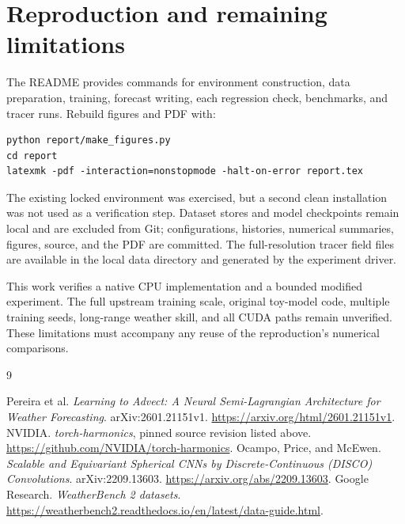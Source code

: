 \documentclass[10pt]{article}
\begin{document}
\section{Reproduction and remaining limitations}
The README provides commands for environment construction, data preparation,
training, forecast writing, each regression check, benchmarks, and tracer runs.
Rebuild figures and PDF with:
\begin{verbatim}
python report/make_figures.py
cd report
latexmk -pdf -interaction=nonstopmode -halt-on-error report.tex
\end{verbatim}
The existing locked environment was exercised, but a second clean installation
was not used as a verification step. Dataset stores and model checkpoints remain
local and are excluded from Git; configurations, histories, numerical summaries,
figures, source, and the PDF are committed. The full-resolution tracer field files
are available in the local data directory and generated by the experiment driver.

This work verifies a native CPU implementation and a bounded modified experiment.
The full upstream training scale, original toy-model code, multiple training seeds,
long-range weather skill, and all CUDA paths remain unverified. These limitations
must accompany any reuse of the reproduction's numerical comparisons.

\begin{thebibliography}{9}
\raggedright
{} Pereira et al. \emph{Learning to Advect: A Neural Semi-Lagrangian
Architecture for Weather Forecasting}. arXiv:2601.21151v1.
\url{https://arxiv.org/html/2601.21151v1}.
 NVIDIA. \emph{torch-harmonics}, pinned source revision listed above.
\url{https://github.com/NVIDIA/torch-harmonics}.
 Ocampo, Price, and McEwen. \emph{Scalable and Equivariant Spherical
CNNs by Discrete-Continuous (DISCO) Convolutions}. arXiv:2209.13603.
\url{https://arxiv.org/abs/2209.13603}.
 Google Research. \emph{WeatherBench 2 datasets}.
\url{https://weatherbench2.readthedocs.io/en/latest/data-guide.html}.
\end{thebibliography}
\end{document}
